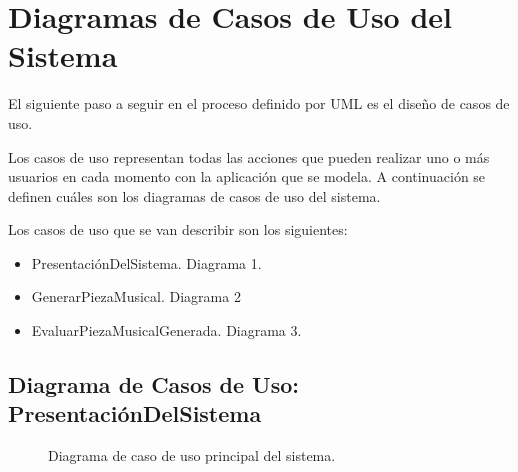 \section{Diagramas de Casos de Uso del Sistema}

El siguiente paso a seguir en el proceso definido por UML es el diseño de casos de uso.

Los casos de uso representan todas las acciones que pueden realizar uno o más usuarios en cada momento con la aplicación que se modela. A continuación se definen cuáles son los diagramas de casos de uso del sistema.

Los casos de uso que se van describir son los siguientes:


\begin{itemize}

    \item PresentaciónDelSistema. Diagrama 1.

    \item GenerarPiezaMusical. Diagrama 2

    \item EvaluarPiezaMusicalGenerada. Diagrama 3.

\end{itemize}

\subsection{Diagrama de Casos de Uso: PresentaciónDelSistema}

\begin{figure}[H]
  \centering
  
  \caption{Diagrama de caso de uso principal del sistema.}
  \label{fig:caso-uso-presentaciondelsistema}
\end{figure}

